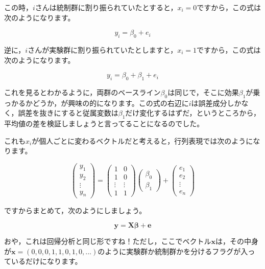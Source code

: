 \documentclass{ltjsbook}
\begin{document}
この時，$i$さんは統制群に割り振られていたとすると，$x_i=0$ですから，この式は次のようになります。

\[ y_i = \beta_0 + e_i \]

逆に，$i$さんが実験群に割り振られていたとしますと，$x_i= 1$ですから，この式は次のようになります。

\[ y_i = \beta_0 + \beta_1 + e_i \]

これを見るとわかるように，両群のベースライン$\beta_0$は同じで，そこに効果$\beta_1$が乗っかるかどうか，が興味の的になります。この式の右辺に$i$は誤差成分しかなく，誤差を抜きにすると従属変数は$\beta_1$だけ変化するはずだ，というところから，平均値の差を検証しましょうと言ってることになるのでした。

これも$x_i$が個人ごとに変わるベクトルだと考えると，行列表現では次のようになります。

\[ \begin{pmatrix}y_1 \\ y_2 \\ \vdots \\y_n \end{pmatrix}=
	\begin{pmatrix} 1 & 0 \\ 1 & 0 \\ \vdots & \vdots \\ 1 & 1 \end{pmatrix}
	\begin{pmatrix} \beta_0 \\ \beta_1 \end{pmatrix} +
	\begin{pmatrix} e_1 \\ e_2 \\ \vdots \\ e_n \end{pmatrix} \]

ですからまとめて，次のようにしましょう。

\[ \bm{y} = \bm{X\beta} + \bm{e} \]

おや，これは回帰分析と同じ形ですね！ただし，ここでベクトル$\bm{x}$は，その中身が$\bm{x} = ( 0,0,0,1,1,0,1,0,...)$のように実験群か統制群かを分けるフラグが入っているだけになります。
\end{document}
